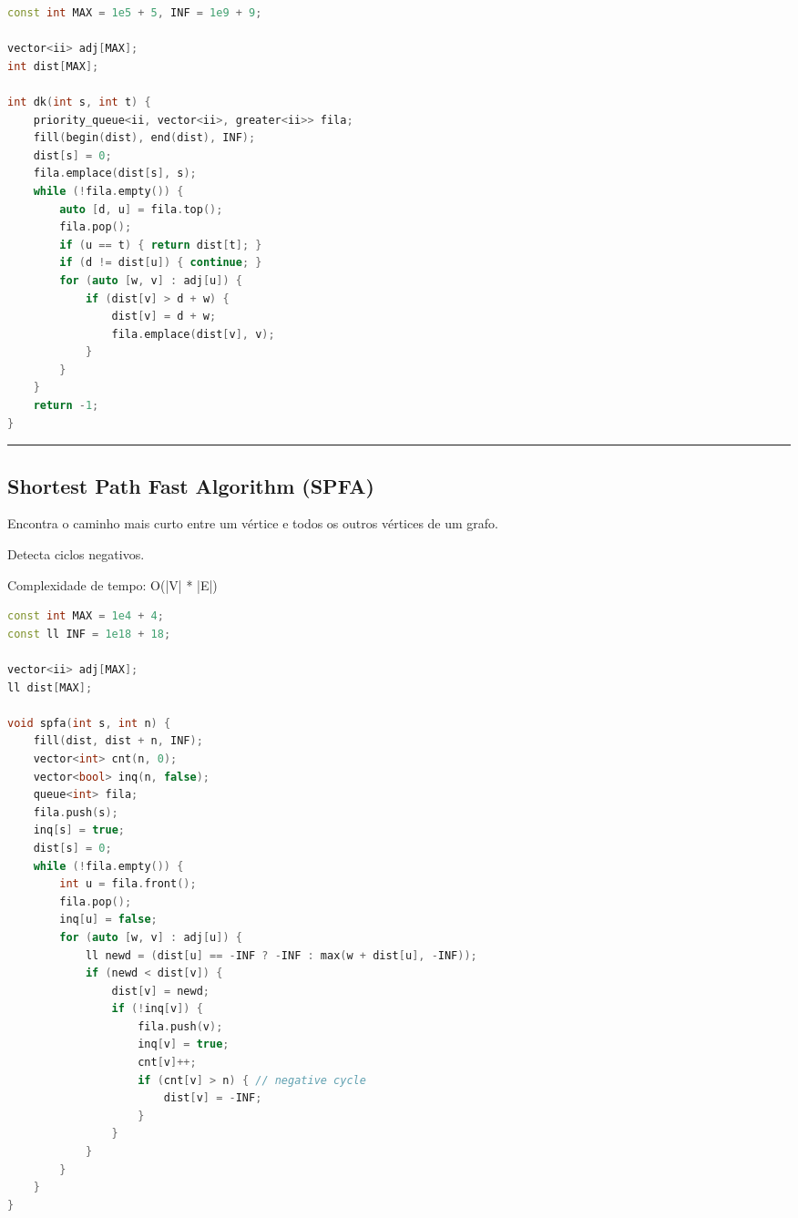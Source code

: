 \documentclass[11pt, a4paper, twoside]{book}
\begin{document}
\begin{multicols}{2}
\begin{lstlisting}[language=C++]
const int MAX = 1e5 + 5, INF = 1e9 + 9;

vector<ii> adj[MAX];
int dist[MAX];

int dk(int s, int t) {
    priority_queue<ii, vector<ii>, greater<ii>> fila;
    fill(begin(dist), end(dist), INF);
    dist[s] = 0;
    fila.emplace(dist[s], s);
    while (!fila.empty()) {
        auto [d, u] = fila.top();
        fila.pop();
        if (u == t) { return dist[t]; }
        if (d != dist[u]) { continue; }
        for (auto [w, v] : adj[u]) {
            if (dist[v] > d + w) {
                dist[v] = d + w;
                fila.emplace(dist[v], v);
            }
        }
    }
    return -1;
}
\end{lstlisting}
\end{multicols}

\hfill

\rule{\textwidth}{0.4pt}

\subsection{Shortest Path Fast Algorithm (SPFA)}



Encontra o caminho mais curto entre um vértice e todos os outros vértices de um grafo.



Detecta ciclos negativos.



Complexidade de tempo: O(|V| * |E|)


\hfill

\begin{lstlisting}[language=C++]
const int MAX = 1e4 + 4;
const ll INF = 1e18 + 18;

vector<ii> adj[MAX];
ll dist[MAX];

void spfa(int s, int n) {
    fill(dist, dist + n, INF);
    vector<int> cnt(n, 0);
    vector<bool> inq(n, false);
    queue<int> fila;
    fila.push(s);
    inq[s] = true;
    dist[s] = 0;
    while (!fila.empty()) {
        int u = fila.front();
        fila.pop();
        inq[u] = false;
        for (auto [w, v] : adj[u]) {
            ll newd = (dist[u] == -INF ? -INF : max(w + dist[u], -INF));
            if (newd < dist[v]) {
                dist[v] = newd;
                if (!inq[v]) {
                    fila.push(v);
                    inq[v] = true;
                    cnt[v]++;
                    if (cnt[v] > n) { // negative cycle
                        dist[v] = -INF;
                    }
                }
            }
        }
    }
}
\end{lstlisting}
\end{document}
